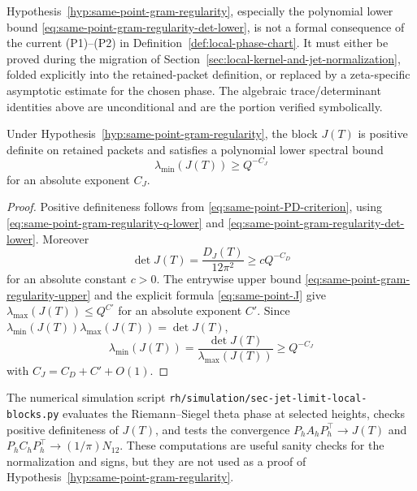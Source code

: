 \begin{wip}\label{rem:wip-same-point-gram-positivity}
Hypothesis~\ref{hyp:same-point-gram-regularity}, especially the polynomial
lower bound \eqref{eq:same-point-gram-regularity-det-lower}, is not a formal
consequence of the current (P1)--(P2) in
Definition~\ref{def:local-phase-chart}.  It must either be proved during the
migration of Section~\ref{sec:local-kernel-and-jet-normalization}, folded
explicitly into the retained-packet definition, or replaced by a zeta-specific
asymptotic estimate for the chosen phase.  The algebraic trace/determinant
identities above are unconditional and are the portion verified symbolically.
\end{wip}

\begin{lemma}
\label{lem:same-point-gram-positivity}
Under Hypothesis~\ref{hyp:same-point-gram-regularity}, the block \(J(T)\) is
positive definite on retained packets and satisfies a polynomial lower
spectral bound
\[
\lambda_{\min}(J(T))\ge Q^{-C_J}
\]
for an absolute exponent \(C_J\).
\end{lemma}

\begin{proof}
Positive definiteness follows from \eqref{eq:same-point-PD-criterion}, using
\eqref{eq:same-point-gram-regularity-q-lower} and
\eqref{eq:same-point-gram-regularity-det-lower}.  Moreover
\[
\det J(T)=\frac{D_J(T)}{12\pi^2}\ge cQ^{-C_D}
\]
for an absolute constant \(c>0\).  The entrywise upper bound
\eqref{eq:same-point-gram-regularity-upper} and the explicit formula
\eqref{eq:same-point-J} give \(\lambda_{\max}(J(T))\le Q^{C'}\) for an
absolute exponent \(C'\).  Since
\(\lambda_{\min}(J(T))\lambda_{\max}(J(T))=\det J(T)\),
\[
\lambda_{\min}(J(T))
=\frac{\det J(T)}{\lambda_{\max}(J(T))}
\ge Q^{-C_J}
\]
with \(C_J=C_D+C'+O(1)\).
\end{proof}

\begin{remark}
\label{rem:same-point-gram-positivity-numerical}
The numerical simulation script
\texttt{rh/simulation/sec-jet-limit-local-blocks.py} evaluates the
Riemann--Siegel theta phase at selected heights, checks positive definiteness
of \(J(T)\), and tests the convergence
\(P_hA_hP_h^\top\to J(T)\) and
\(P_hC_hP_h^\top\to(1/\pi)N_{12}\).  These computations are useful sanity
checks for the normalization and signs, but they are not used as a proof of
Hypothesis~\ref{hyp:same-point-gram-regularity}.
\end{remark}
